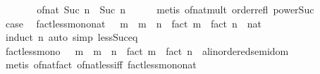 \begin{isabellebody}
\ \ \isamarkupfalse%
\ \isamarkupfalse%
\ {\isachardoublequoteopen}{\isasymdots}\ {\isasymle}\ of{\isacharunderscore}{\kern0pt}nat\ {\isacharparenleft}{\kern0pt}Suc\ n\ {\isacharcircum}{\kern0pt}\ Suc\ n{\isacharparenright}{\kern0pt}{\isachardoublequoteclose}\isanewline
\ \ \ \ \isamarkupfalse%
\ {\isacharparenleft}{\kern0pt}metis\ of{\isacharunderscore}{\kern0pt}nat{\isacharunderscore}{\kern0pt}mult\ order{\isacharunderscore}{\kern0pt}refl\ power{\isacharunderscore}{\kern0pt}Suc{\isacharparenright}{\kern0pt}\isanewline
\ \ \isamarkupfalse%
\ \isamarkupfalse%
\ {\isacharquery}{\kern0pt}case\ \isacommand{{\isachardot}{\kern0pt}}\isamarkupfalse%
\isanewline
{}\isamarkupfalse%
%
\endisatagproof
{\isafoldproof}%
%
\isadelimproof
\isanewline
%
\endisadelimproof
\isanewline
{}\isamarkupfalse%
\isanewline
\isanewline
{}\isamarkupfalse%
\ fact{\isacharunderscore}{\kern0pt}less{\isacharunderscore}{\kern0pt}mono{\isacharunderscore}{\kern0pt}nat{\isacharcolon}{\kern0pt}\ {\isachardoublequoteopen}{}\ {\isacharless}{\kern0pt}\ m\ {\isasymLongrightarrow}\ m\ {\isacharless}{\kern0pt}\ n\ {\isasymLongrightarrow}\ fact\ m\ {\isacharless}{\kern0pt}\ {\isacharparenleft}{\kern0pt}fact\ n\ {\isacharcolon}{\kern0pt}{\isacharcolon}{\kern0pt}\ nat{\isacharparenright}{\kern0pt}{\isachardoublequoteclose}\isanewline
%
\isadelimproof
\ \ %
\endisadelimproof
%
\isatagproof
{}\isamarkupfalse%
\ {\isacharparenleft}{\kern0pt}induct\ n{\isacharparenright}{\kern0pt}\ {\isacharparenleft}{\kern0pt}auto\ simp{\isacharcolon}{\kern0pt}\ less{\isacharunderscore}{\kern0pt}Suc{\isacharunderscore}{\kern0pt}eq{\isacharparenright}{\kern0pt}%
\endisatagproof
{\isafoldproof}%
%
\isadelimproof
\isanewline
%
\endisadelimproof
\isanewline
{}\isamarkupfalse%
\ fact{\isacharunderscore}{\kern0pt}less{\isacharunderscore}{\kern0pt}mono{\isacharcolon}{\kern0pt}\ {\isachardoublequoteopen}{}\ {\isacharless}{\kern0pt}\ m\ {\isasymLongrightarrow}\ m\ {\isacharless}{\kern0pt}\ n\ {\isasymLongrightarrow}\ fact\ m\ {\isacharless}{\kern0pt}\ {\isacharparenleft}{\kern0pt}fact\ n\ {\isacharcolon}{\kern0pt}{\isacharcolon}{\kern0pt}\ {\isacharprime}{\kern0pt}a{\isacharcolon}{\kern0pt}{\isacharcolon}{\kern0pt}linordered{\isacharunderscore}{\kern0pt}semidom{\isacharparenright}{\kern0pt}{\isachardoublequoteclose}\isanewline
%
\isadelimproof
\ \ %
\endisadelimproof
%
\isatagproof
{}\isamarkupfalse%
\ {\isacharparenleft}{\kern0pt}metis\ of{\isacharunderscore}{\kern0pt}nat{\isacharunderscore}{\kern0pt}fact\ of{\isacharunderscore}{\kern0pt}nat{\isacharunderscore}{\kern0pt}less{\isacharunderscore}{\kern0pt}iff\ fact{\isacharunderscore}{\kern0pt}less{\isacharunderscore}{\kern0pt}mono{\isacharunderscore}{\kern0pt}nat{\isacharparenright}{\kern0pt}%

\end{isabellebody}
